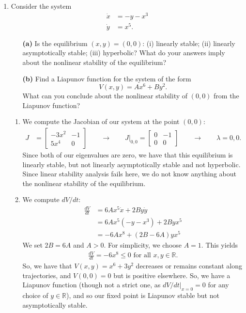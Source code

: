 \documentclass[10pt,letterpaper]{report}
\newcommand{\R}{\mathbb{R}}
\newcommand{\so}{\qquad \rightarrow \qquad}
\newcommand{\mtx}[2]{\left[\begin{array}{#1}#2\end{array}\right]}
\begin{document}
\begin{enumerate}
\item \begin{qbox}
Consider the system
\begin{align*}
    \dot x &= -y - x^3 \\
    \dot y &= x^5.
\end{align*}
\begin{itemize}
    \item[\textbf{(a)}] Is the equilibrium $(x, y) = (0, 0)$: (i) linearly stable; (ii) linearly asymptotically stable; (iii) hyperbolic? What do your answers imply about the nonlinear stability of the equilibrium?
    
    \item[\textbf{(b)}] Find a Liapunov function for the system of the form
    \[
    V (x, y) = Ax^6 +B y^2.
    \]
    What can you conclude about the nonlinear stability of $(0, 0)$ from the Liapunov function?
\end{itemize}
\end{qbox}

\begin{enumerate}
    \item We compute the Jacobian of our system at the point $(0, 0):$
    \begin{align*}
        J &= \mtx{rr}{-3x^2 & -1 \\ 5x^4 & 0} \so
        J\big\vert_{0,0} = \mtx{rr}{0 & -1 \\ 0 & 0} \so \lambda = 0, 0.
    \end{align*}
    Since both of our eigenvalues are zero, we have that this equilibrium is linearly stable, but not linearly asymptotically stable and not hyperbolic. Since linear stability analysis fails here, we do not know anything about the nonlinear stability of the equilibrium.
    
    \item We compute $dV/dt:$
    \begin{align*}
        \frac{dV}{dt} &= 6Ax^5 \dot x + 2By \dot y \\
        &= 6Ax^5\left(-y - x^3\right) + 2Byx^5 \\
        &= -6Ax^8 + (2B - 6A)yx^5
    \end{align*}
    We set $2B = 6A$ and $A > 0$. For simplicity, we choose $A = 1$. This yields
    \begin{align*}
        \frac{dV}{dt} = -6x^8 \leq 0 \textrm{ for all }x, y \in \R.
    \end{align*}
    So, we have that $V(x, y) = x^6 + 3y^2$ decreases or remains constant along trajectories, and $V(0, 0) = 0$ but is positive elsewhere. So, we have a Liapunov function (though not a strict one, as $dV/dt\big\vert_{x = 0} = 0$ for any choice of $y \in \R$), and so our fixed point is Liapunov stable but not asymptotically stable.
\end{enumerate}


\end{enumerate}
\end{document}
